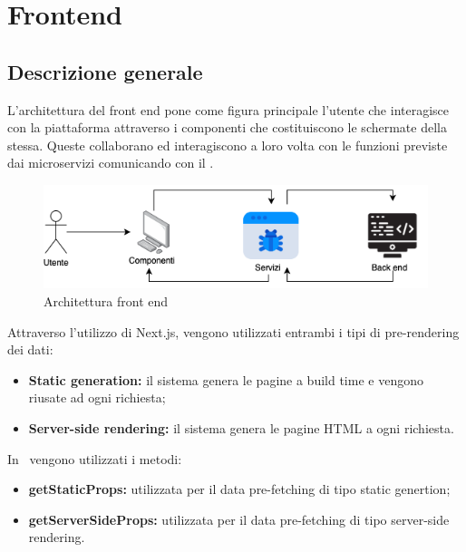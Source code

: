 \newpage
\section{Frontend}\label{Frontend}
\subsection{Descrizione generale}\label{FeDescrizione}
L'architettura del front end pone come figura principale l'utente che interagisce con la piattaforma attraverso i componenti che costituiscono le schermate della stessa. Queste collaborano ed interagiscono a loro volta con le funzioni previste dai microservizi comunicando con il .
\begin{figure}[H]
	\centering
	\includegraphics[scale=0.6]{Immagini/Frontend/fe.png}
	\caption{Architettura front end}
	\label{fig:fe}
\end{figure}
Attraverso l'utilizzo di Next.js, vengono utilizzati entrambi i tipi di pre-rendering dei dati: 
\begin{itemize}
	\item \textbf{Static generation:} il sistema genera le pagine  a build time e vengono riusate ad ogni richiesta;
	\item \textbf{Server-side rendering:} il sistema genera le pagine HTML a ogni richiesta.
\end{itemize}
In \NomeProgetto\ vengono utilizzati i metodi:
\begin{itemize}
	\item \textbf{getStaticProps:} utilizzata per il data pre-fetching di tipo static genertion;
	\item \textbf{getServerSideProps:} utilizzata per il data pre-fetching di tipo server-side rendering.
\end{itemize}
